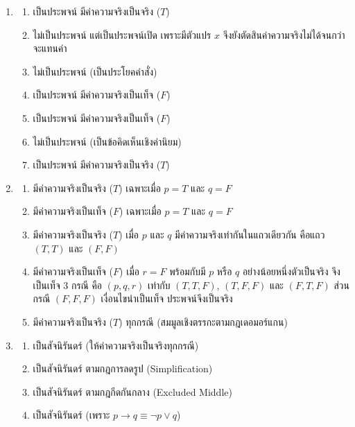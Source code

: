 \begin{enumerate}[label={},leftmargin=1.5em]
    \item
    \begin{enumerate}[label=\textbf{\thechapter.\arabic{enumi}.\arabic*}]
        \item เป็นประพจน์ มีค่าความจริงเป็นจริง ($T$)
        \item ไม่เป็นประพจน์ แต่เป็นประพจน์เปิด เพราะมีตัวแปร $x$ จึงยังตัดสินค่าความจริงไม่ได้จนกว่าจะแทนค่า
        \item ไม่เป็นประพจน์ (เป็นประโยคคำสั่ง)
        \item เป็นประพจน์ มีค่าความจริงเป็นเท็จ ($F$)
        \item เป็นประพจน์ มีค่าความจริงเป็นเท็จ ($F$)
        \item ไม่เป็นประพจน์ (เป็นข้อคิดเห็นเชิงค่านิยม)
        \item เป็นประพจน์ มีค่าความจริงเป็นจริง ($T$)
    \end{enumerate}

    \item
    \begin{enumerate}[label=\textbf{\thechapter.\arabic{enumi}.\arabic*}]
        \item มีค่าความจริงเป็นจริง ($T$) เฉพาะเมื่อ $p=T$ และ $q=F$
        \item มีค่าความจริงเป็นเท็จ ($F$) เฉพาะเมื่อ $p=T$ และ $q=F$
        \item มีค่าความจริงเป็นจริง ($T$) เมื่อ $p$ และ $q$ มีค่าความจริงเท่ากันในแถวเดียวกัน คือแถว $(T,T)$ และ $(F,F)$
        \item มีค่าความจริงเป็นเท็จ ($F$) เมื่อ $r=F$ พร้อมกับมี $p$ หรือ $q$ อย่างน้อยหนึ่งตัวเป็นจริง จึงเป็นเท็จ 3 กรณี คือ $(p,q,r)$ เท่ากับ $(T,T,F)$, $(T,F,F)$ และ $(F,T,F)$ ส่วนกรณี $(F,F,F)$ เงื่อนไขนำเป็นเท็จ ประพจน์จึงเป็นจริง
        \item มีค่าความจริงเป็นจริง ($T$) ทุกกรณี (สมมูลเชิงตรรกะตามกฎเดอมอร์แกน)
    \end{enumerate}

    \item
    \begin{enumerate}[label=\textbf{\thechapter.\arabic{enumi}.\arabic*}]
        \item เป็นสัจนิรันดร์ (ให้ค่าความจริงเป็นจริงทุกกรณี)
        \item เป็นสัจนิรันดร์ ตามกฎการลดรูป (Simplification)
        \item เป็นสัจนิรันดร์ ตามกฎกีดกันกลาง (Excluded Middle)
        \item เป็นสัจนิรันดร์ (เพราะ $p \rightarrow q \equiv \neg p \lor q$)
    \end{enumerate}


\end{enumerate}
